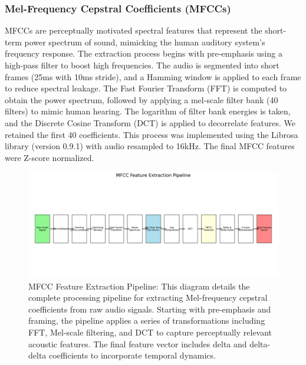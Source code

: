 \documentclass[12pt]{article}
\begin{document}
\subsubsection{Mel-Frequency Cepstral Coefficients (MFCCs)}
MFCCs are perceptually motivated spectral features that represent the short-term power spectrum of sound, mimicking the human auditory system's frequency response. The extraction process begins with pre-emphasis using a high-pass filter to boost high frequencies. The audio is segmented into short frames (25ms with 10ms stride), and a Hamming window is applied to each frame to reduce spectral leakage. The Fast Fourier Transform (FFT) is computed to obtain the power spectrum, followed by applying a mel-scale filter bank (40 filters) to mimic human hearing. The logarithm of filter bank energies is taken, and the Discrete Cosine Transform (DCT) is applied to decorrelate features. We retained the first 40 coefficients. This process was implemented using the Librosa library (version 0.9.1) with audio resampled to 16kHz. The final MFCC features were Z-score normalized.

\begin{figure}[h]
    \centering
    \includegraphics[width=1.0\linewidth]{Figures_Improved/mfcc_pipeline_improved.png}
    \caption{MFCC Feature Extraction Pipeline: This diagram details the complete processing pipeline for extracting Mel-frequency cepstral coefficients from raw audio signals. Starting with pre-emphasis and framing, the pipeline applies a series of transformations including FFT, Mel-scale filtering, and DCT to capture perceptually relevant acoustic features. The final feature vector includes delta and delta-delta coefficients to incorporate temporal dynamics.}
    \label{fig:mfcc_pipeline}
\end{figure}
\end{document}
